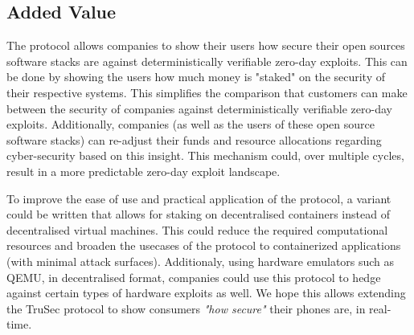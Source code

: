\subsection{Added Value}
The protocol allows companies to show their users how secure their open sources software stacks are against deterministically verifiable zero-day exploits. This can be done by showing the users how much money is "staked" on the security of their respective systems. This simplifies the comparison that customers can make between the security of companies against deterministically verifiable zero-day exploits. Additionally, companies (as well as the users of these open source software stacks) can re-adjust their funds and resource allocations regarding cyber-security based on this insight. This mechanism could, over multiple cycles, result in a more predictable zero-day exploit landscape.

To improve the ease of use and practical application of the protocol, a variant could be written that allows for staking on decentralised containers instead of decentralised virtual machines. This could reduce the required computational resources and broaden the usecases of the protocol to containerized applications (with minimal attack surfaces). Additionaly, using hardware emulators such as QEMU, in decentralised format, companies could use this protocol to hedge against certain types of hardware exploits as well. We hope this allows extending the TruSec protocol to show consumers \textit{"how secure"} their phones are, in real-time.
